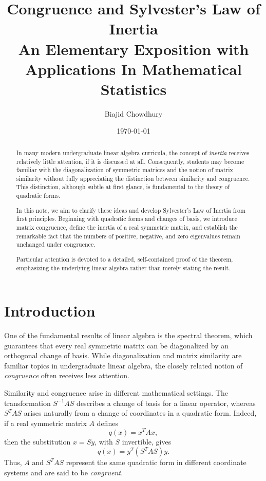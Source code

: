 \documentclass[11pt]{article}
\title{\textbf{Congruence and Sylvester's Law of Inertia}\\
\large An Elementary Exposition with Applications In Mathematical Statistics}
\author{Biajid Chowdhury
}
\date{\today}
\theoremstyle{definition}
\theoremstyle{remark}
\begin{document}
\maketitle

\begin{abstract}

In many modern undergraduate linear algebra curricula,
the concept of \emph{inertia} receives relatively little
attention, if it is discussed at all. Consequently,
students may become familiar with the diagonalization
of symmetric matrices and the notion of matrix
similarity without fully appreciating the distinction
between similarity and congruence. This distinction,
although subtle at first glance, is fundamental to
the theory of quadratic forms.

In this note, we aim to clarify these ideas and
develop Sylvester's Law of Inertia from first
principles. Beginning with quadratic forms and
changes of basis, we introduce matrix congruence,
define the inertia of a real symmetric matrix,
and establish the remarkable fact that the numbers
of positive, negative, and zero eigenvalues remain
unchanged under congruence.

Particular attention is devoted to a detailed,
self-contained proof of the theorem, emphasizing
the underlying linear algebra rather than merely
stating the result.

\end{abstract}

\tableofcontents
\newpage

\section{Introduction}

One of the fundamental results of linear algebra is the
spectral theorem, which guarantees that every real symmetric
matrix can be diagonalized by an orthogonal change of basis.
While diagonalization and matrix similarity are familiar
topics in undergraduate linear algebra, the closely related
notion of \emph{congruence} often receives less attention.

Similarity and congruence arise in different mathematical
settings. The transformation $S^{-1}AS$ describes a change
of basis for a linear operator, whereas $S^TAS$ arises
naturally from a change of coordinates in a quadratic form.
Indeed, if a real symmetric matrix $A$ defines
\[
    q(x)=x^TAx,
\]
then the substitution $x=Sy$, with $S$ invertible, gives
\[
    q(x)=y^T(S^TAS)y.
\]
Thus, $A$ and $S^TAS$ represent the same quadratic form
in different coordinate systems and are said to be
\emph{congruent}.
\end{document}
